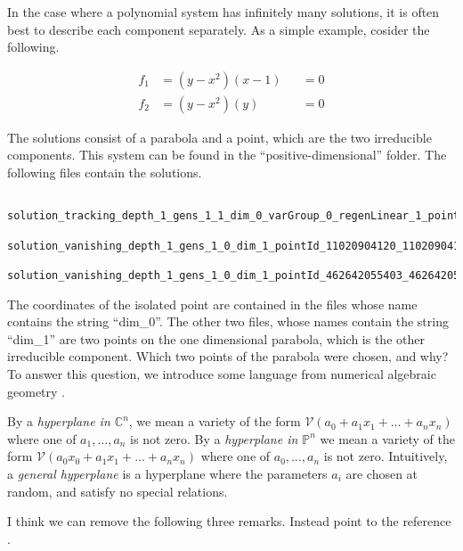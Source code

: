 \documentclass[12pt]{article}
\theoremstyle{definition}
\newcommand{\C}{\mathbb{C}}
\newcommand{\PP}{\mathbb{P}}
\newcommand{\red}[1]{{\color{red}#1}}
\begin{document}
In the case where a polynomial system has infinitely many solutions, it is 
often best to describe each component separately. As a simple example, 
cosider the following.

\begin{align*}
   f_1 &= (y-x^2)(x-1) &&= 0\\
   f_2 &= (y-x^2)(y) &&= 0
\end{align*}

The solutions consist of a parabola and a point, which are the two 
irreducible components. This system can be found in the 
``positive-dimensional'' folder. The following files contain the solutions.
\begin{leftbar}
\vspace{-10pt} 
\begin{verbatim}
      solution_tracking_depth_1_gens_1_1_dim_0_varGroup_0_regenLinear_1_pointId_151979748598_138051236175
      solution_vanishing_depth_1_gens_1_0_dim_1_pointId_11020904120_11020904120
      solution_vanishing_depth_1_gens_1_0_dim_1_pointId_462642055403_462642055403
\end{verbatim}\vspace{-10pt} 
\end{leftbar}

The coordinates of the isolated point are contained in the files whose 
name contains the string ``dim\_0''. The other two files, whose names 
contain the string ``dim\_1'' are two points on the one dimensional 
parabola, which is the other irreducible component. Which two points of 
the parabola were chosen, and why? To answer this question, we introduce 
some language from numerical algebraic geometry \cite{BertiniBook,SWBook}.

By a \emph{hyperplane in $\C^n$}, we mean a variety of the form 
$\mathcal{V}(a_0 + a_1x_1 + \ldots + a_nx_n)$ where one of $a_1, \ldots, 
a_n$ is not zero. By a \emph{hyperplane in 
$\PP^n$} we mean a variety of the form $\mathcal{V}(a_0x_0 + a_1x_1 
+ \ldots + a_nx_n)$ where one of $a_0, \ldots, a_n$ is not zero. 
Intuitively, a \emph{general hyperplane} is a 
hyperplane where the parameters $a_i$ are chosen at random, and satisfy 
no special relations. 

\red{I think we can remove the following three remarks. Instead point to the reference \cite{SWBook}.}
\end{document}
